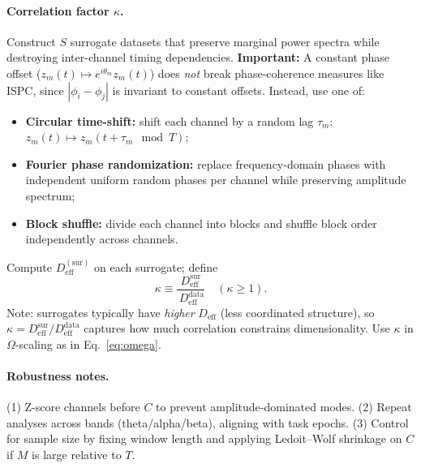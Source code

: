 \documentclass[12pt]{article}
\numberwithin{equation}{section}
\begin{document}
\paragraph{Correlation factor $\kappa$.}
Construct $S$ surrogate datasets that preserve marginal power spectra while destroying inter-channel timing dependencies. \textbf{Important:} A constant phase offset ($z_m(t)\mapsto e^{i\theta_m} z_m(t)$) does \emph{not} break phase-coherence measures like ISPC, since $|\phi_i - \phi_j|$ is invariant to constant offsets. Instead, use one of:
\begin{itemize}
\item \textbf{Circular time-shift:} shift each channel by a random lag $\tau_m$: $z_m(t) \mapsto z_m(t + \tau_m \mod T)$;
\item \textbf{Fourier phase randomization:} replace frequency-domain phases with independent uniform random phases per channel while preserving amplitude spectrum;
\item \textbf{Block shuffle:} divide each channel into blocks and shuffle block order independently across channels.
\end{itemize}
Compute $D_{\mathrm{eff}}^{(\text{sur})}$ on each surrogate; define
\[
\kappa \equiv \frac{D_{\mathrm{eff}}^{\text{sur}}}{\, D_{\mathrm{eff}}^{\text{data}}} \quad (\kappa\ge 1).
\]
Note: surrogates typically have \emph{higher} $D_{\mathrm{eff}}$ (less coordinated structure), so $\kappa = D_{\mathrm{eff}}^{\text{sur}}/D_{\mathrm{eff}}^{\text{data}}$ captures how much correlation constrains dimensionality. Use $\kappa$ in $\Omega$-scaling as in Eq.~\ref{eq:omega}.

\paragraph{Robustness notes.}
(1) Z-score channels before $C$ to prevent amplitude-dominated modes. (2) Repeat analyses across bands (theta/alpha/beta), aligning with task epochs. (3) Control for sample size by fixing window length and applying Ledoit--Wolf shrinkage on $C$ if $M$ is large relative to $T$.
\end{document}

